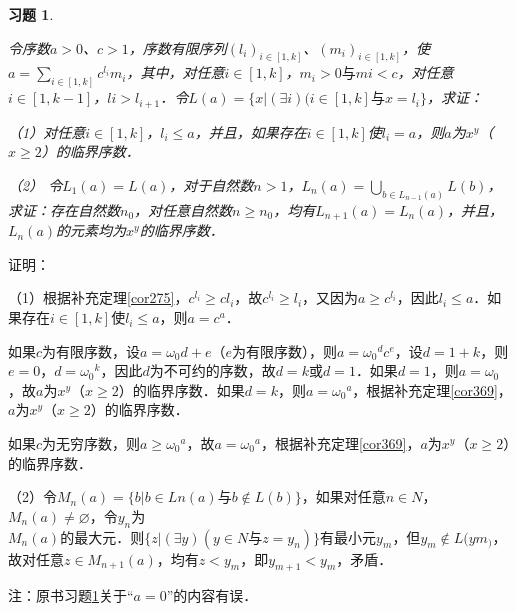 \documentclass[12pt, a4paper, oneside]{book}
\newtheorem{exer}{习题}
\begin{document}
			\begin{exer}\label{exer170}
				\hfill\par
				令序数$a>0$、$c>1$，序数有限序列$(l_i)_{i\in [1, k]}$、$(m_i)_{i\in [1, k]}$，使$a=\sum\limits_{i\in [1, k]}c^{l_i}m_i$，其中，对任意$i\in [1, k]$，$m_i>0\text{与}mi<c$，对任意$i\in [1, k-1]$，$li>l_{i+1}$．令$L(a)=\{x|(\exists i)(i\in [1, k]\text{与}x=l_i\}$，求证：
				\par
				（1）对任意$i\in [1, k]$，$l_i\leq a$，并且，如果存在$i\in [1, k]$使$l_i=a$，则$a$为$x^y$（$x\geq 2$）的临界序数．
				\par
				（2）	令$L_1(a)=L(a)$，对于自然数$n>1$，$L_n(a)=\bigcup\limits_{b\in L_{n-1}(a)}L(b)$，求证：存在自然数$n_0$，对任意自然数$n\geq n_0$，均有$L_{n+1}(a)=L_n(a)$，并且，$L_n(a)$的元素均为$x^y$的临界序数．
			\end{exer}
			证明：
			\par
			（1）根据补充定理\ref{cor275}，$c^{l_i}\geq cl_i$，故$c^{l_i}\geq l_i$，又因为$a\geq c^{l_i}$，因此$l_i\leq a$．如果存在$i\in [1, k]$使$l_i\leq a$，则$a=c^a$．
			\par
			如果$c$为有限序数，设$a=\omega_0d+e$（$e$为有限序数），则$a={\omega_0}^dc^e$，设$d=1+k$，则$e=0$，$d={\omega_0}^k$，因此$d$为不可约的序数，故$d=k$或$d=1$．如果$d=1$，则$a=\omega_0$，故$a$为$x^y$（$x\geq 2$）的临界序数．如果$d=k$，则$a={\omega_0}^a$，根据补充定理\ref{cor369}，$a$为$x^y$（$x\geq 2$）的临界序数．
			\par
			如果$c$为无穷序数，则$a\geq {\omega_0}^a$，故$a={\omega_0}^a$，根据补充定理\ref{cor369}，$a$为$x^y$（$x\geq 2$）的临界序数．
			\par
			（2）令$M_n(a)=\{b|b\in Ln(a)\text{与}b\notin L(b)\}$，如果对任意$n\in N$，$M_n(a)\neq \varnothing$，令$y_n$为\\$M_n(a)$的最大元．则$\{z|(\exists y)(y\in N\text{与}z=y_n)\}$有最小元$y_m$，但$y_m\notin L(ym_)$，故对任意$z\in M_{n+1}(a)$，均有$z<y_m$，即$y_{m+1}<y_m$，矛盾．
			\par
			注：原书习题\ref{exer170}关于“$a=0$”的内容有误．
			
\end{document}
